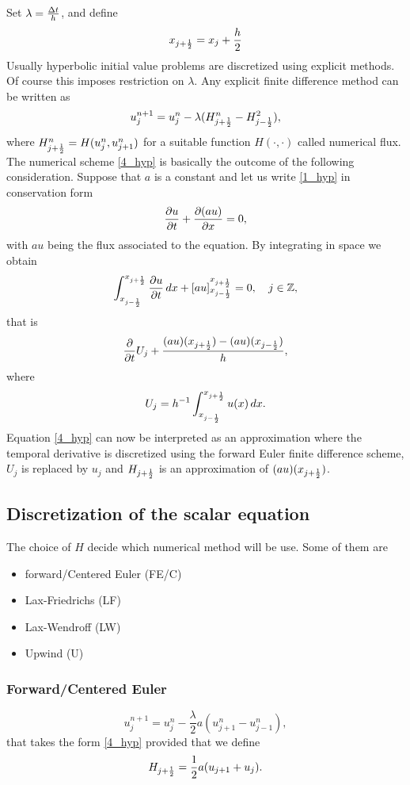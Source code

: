 Set \(\lambda = \frac{\Delta t}{h}\), and define 
\[
    x_{j+\frac{1}{2}} = x_j + \frac{h}{2}
\]
Usually hyperbolic initial value problems are discretized using explicit methods. Of course this imposes restriction on \(\lambda\). Any explicit finite difference method can be written as 
\begin{equation}
    u^{n+1}_j = u^n_j -\lambda(H^n_{j+\frac{1}{2}} - H^2_{j-\frac{1}{2}}),
    \label{4_hyp}
\end{equation}
where \(H^n_{j+\frac{1}{2}} = H(u_j^n, u^n_{j+1})\) for a suitable function \(H(\cdot, \cdot)\) called numerical flux.
The numerical scheme \eqref{4_hyp} is basically the outcome of the following consideration. Suppose that \(a\) is a constant and let us write \eqref{1_hyp} in conservation form 
\[
    \partialderivative{u}{t} + \partialderivative{(au)}{x} = 0,
\]
with \(au\) being the flux associated to the equation. By integrating in space we obtain 
\[
    \int_{x_{j-\onehalf}}^{x_{j+\onehalf}} \partialderivative{u}{t} \, dx + \left[ au \right]_{x_{j-\onehalf}}^{x_{j+\onehalf}} = 0, \quad j \in \mathbb{Z},
\]
that is 
\[
    \pderivative{t} U_j + \frac{(au)(x_{j+\onehalf}) - (au)(x_{j-\onehalf})}{h},
\]
where 
\[
    U_j = h^{-1} \int_{x_{j-\frac{1}{2}}}^{x_{j+\frac{1}{2}}} u(x) \, dx.
\]
Equation \eqref{4_hyp} can now be interpreted as an approximation where the temporal derivative is discretized using the forward Euler finite difference scheme, \(U_j\) is replaced by \(u_j\) and \(H_{j+\frac{1}{2}}\) is an approximation of \((au)(x_{j+\frac{1}{2}})\).
\subsection{Discretization of the scalar equation}
The choice of \(H\) decide which numerical method will be use. Some of them are 
\begin{itemize}
    \item forward/Centered Euler (FE/C)
    \item Lax-Friedrichs (LF)
    \item Lax-Wendroff (LW)
    \item Upwind (U)
\end{itemize}
\subsubsection*{Forward/Centered Euler}
\begin{equation}
    u_j^{n+1} = u_j^n - \frac{\lambda}{2} a(u^n_{j+1} - u^n_{j-1}),
    \label{5_hyp}
\end{equation}
that takes the form \eqref{4_hyp} provided that we define 
\begin{equation}
    H_{j+\frac{1}{2}} = \frac{1}{2} a(u_{j+1} + u_j). 
    \label{6_hyp}
\end{equation}
